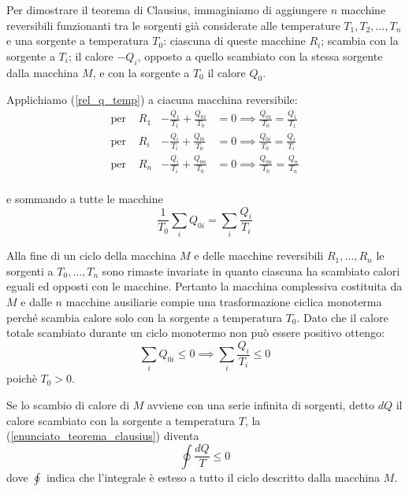\documentclass[class=book, crop=false, oneside, 12pt]{standalone}
\begin{document}
Per dimostrare il teorema di Clausius, immaginiamo di aggiungere \(n\) macchine reversibili funzionanti tra le sorgenti già considerate alle temperature \(T_1 , T_2 , ... , T_n\) e una sorgente a temperatura \(T_0\): ciascuna di queste macchine \(R_i\); scambia con la sorgente a \(T_i\); il calore \(-Q_i\), opposto a quello scambiato con la stessa sorgente dalla macchina \(M\), e con la sorgente a \(T_0\) il calore \(Q_0\).

Applichiamo (\ref{rel_q_temp}) a ciacuna macchina reversibile:\\
\begin{align*}
    \text{per } &R_1 & -\frac{Q_1}{T_1} + \frac{Q_{01}}{T_0} &= 0 \implies \frac{Q_{01}}{T_0} = \frac{Q_1}{T_1} \\
    \text{per } &R_i & -\frac{Q_i}{T_i} + \frac{Q_{0i}}{T_0} &= 0 \implies \frac{Q_{0i}}{T_0} = \frac{Q_i}{T_i} \\
    \text{per } &R_n & -\frac{Q_i}{T_i} + \frac{Q_{0n}}{T_0} &= 0 \implies \frac{Q_{0n}}{T_0} = \frac{Q_n}{T_n} \\
\end{align*}

e sommando a tutte le macchine 
\begin{equation*}
    \frac{1}{T_0} \sum_i Q_{0i} = \sum_{i} \frac{Q_i}{T_i}
\end{equation*}

Alla fine di un ciclo della macchina \(M\) e delle macchine reversibili \(R_1, ... , R_n\) le sorgenti a \(T_0, ... , T_n\) sono rimaste invariate in quanto ciascuna ha scambiato calori eguali ed opposti con le macchine. 
Pertanto la macchina complessiva costituita da \(M\) e dalle \(n\) macchine ausiliarie compie una trasformazione ciclica monoterma perché scambia calore solo con la sorgente a temperatura \(T_0\).
Dato che il calore totale scambiato durante un ciclo monotermo non può essere positivo ottengo:
\begin{equation*}
    \sum_i Q_{0i} \leq 0 \implies \sum_i \frac{Q_i}{T_i} \leq 0
\end{equation*}
poichè \(T_0 > 0 \).

Se lo scambio di calore di \(M\) avviene con una serie infinita di sorgenti, detto \(d Q\) il calore scambiato con la sorgente a temperatura \(T\), la (\ref{enunciato_teorema_clausius}) diventa
\begin{equation} \label{conclusione_dim_teorema_clausius}
    \oint \frac{d Q}{T} \leq 0
\end{equation}
dove \(\oint\) indica che l'integrale è esteso a tutto il ciclo descritto dalla macchina \(M\).
\end{document}
